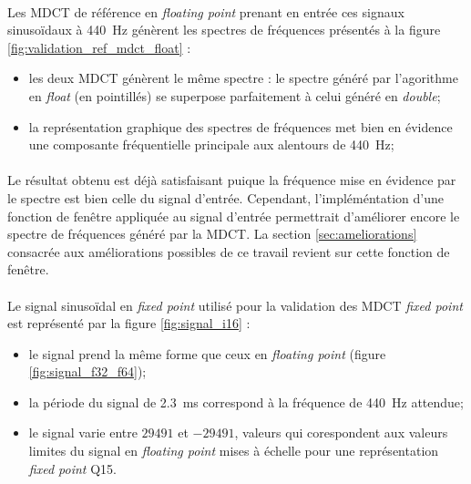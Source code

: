 \documentclass{article}
\begin{document}
    \paragraph{}
    Les MDCT de référence en \emph{floating point} prenant en entrée ces signaux sinusoïdaux à \SI{440}{\hertz} génèrent les spectres de fréquences présentés à la figure \ref{fig:validation_ref_mdct_float} :
    \begin{itemize}
        \item les deux MDCT génèrent le même spectre : le spectre généré par l'agorithme en \emph{float} (en pointillés) se superpose parfaitement à celui généré en \emph{double};
        \item la représentation graphique des spectres de fréquences met bien en évidence une composante fréquentielle principale aux alentours de \SI{440}{\hertz};
    \end{itemize}

    \paragraph{}
    Le résultat obtenu est déjà satisfaisant puique la fréquence mise en évidence par le spectre est bien celle du signal d'entrée. Cependant, l'impléméntation d'une fonction de fenêtre appliquée au signal d'entrée permettrait d'améliorer encore le spectre de fréquences généré par la MDCT. La section \ref{sec:ameliorations} consacrée aux améliorations possibles de ce travail revient sur cette fonction de fenêtre.

    \paragraph{}
    Le signal sinusoïdal en \emph{fixed point} utilisé pour la validation des MDCT \emph{fixed point} est représenté par la figure \ref{fig:signal_i16} :
    \begin{itemize}
        \item le signal prend la même forme que ceux en \emph{floating point} (figure \ref{fig:signal_f32_f64});
        \item la période du signal de \SI{2.3}{\milli\second} correspond à la fréquence de \SI{440}{\hertz} attendue;
        \item le signal varie entre $29491$ et $-29491$, valeurs qui corespondent aux valeurs limites du signal en \emph{floating point} mises à échelle pour une représentation \emph{fixed point} Q15.
    \end{itemize}
\end{document}
